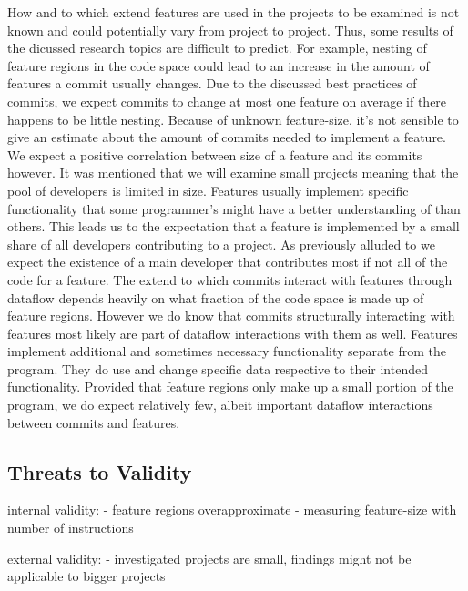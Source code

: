 How and to which extend features are used in the projects to be examined is not known and could potentially vary from project to project.
Thus, some results of the dicussed research topics are difficult to predict.
For example, nesting of feature regions in the code space could lead to an increase in the amount of features a commit usually changes.
Due to the discussed best practices of commits, we expect commits to change at most one feature on average if there happens to be little nesting.
Because of unknown feature-size, it's not sensible to give an estimate about the amount of commits needed to implement a feature.
We expect a positive correlation between size of a feature and its commits however.
It was mentioned that we will examine small projects meaning that the pool of developers is limited in size. 
Features usually implement specific functionality that some programmer's might have a better understanding of than others.
This leads us to the expectation that a feature is implemented by a small share of all developers contributing to a project.
As previously alluded to we expect the existence of a main developer that contributes most if not all of the code for a feature.
The extend to which commits interact with features through dataflow depends heavily on what fraction of the code space is made up of feature regions.
However we do know that commits structurally interacting with features most likely are part of dataflow interactions with them as well.
Features implement additional and sometimes necessary functionality separate from the program.
They do use and change specific data respective to their intended functionality. 
Provided that feature regions only make up a small portion of the program, we do expect relatively few, albeit important dataflow interactions between commits and features.

\subsection*{Threats to Validity}\label{sec:threats}

internal validity:
	- feature regions overapproximate
	- measuring feature-size with number of instructions

external validity:
	- investigated projects are small, findings might not be applicable to bigger projects
	



